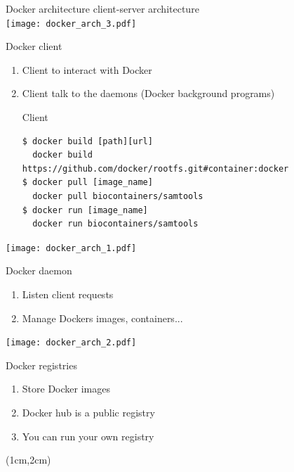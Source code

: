 \begin{frame}{Docker architecture}
client-server architecture \\
\centering\texttt{[image: docker\_arch\_3.pdf]}
\end{frame}

\begin{frame}[fragile]{Docker client}
\begin{enumerate}
\item<1-> Client to interact with Docker
\item<2-> Client talk to the daemons (Docker background programs)
\begin{block}{Client}
\begin{verbatim}
$ docker build [path][url] 
  docker build https://github.com/docker/rootfs.git#container:docker
$ docker pull [image_name]
  docker pull biocontainers/samtools
$ docker run [image_name]
  docker run biocontainers/samtools
\end{verbatim}
\end{block}
\end{enumerate}

\begin{center}
\texttt{[image: docker\_arch\_1.pdf]}
\end{center}
\end{frame}

\begin{frame}[<+->]{Docker daemon}
\begin{enumerate}
\item Listen client requests
\item Manage Dockers images, containers...
\end{enumerate}
\centering\texttt{[image: docker\_arch\_2.pdf]}
\end{frame}

\begin{frame}[<+->]{Docker registries}
\begin{enumerate}
\item Store Docker images
\item Docker hub is a public registry
\item You can run your own registry
\end{enumerate}
\begin{textblock*}{10cm}(1cm,2cm)
\end{textblock*}
\end{frame}

